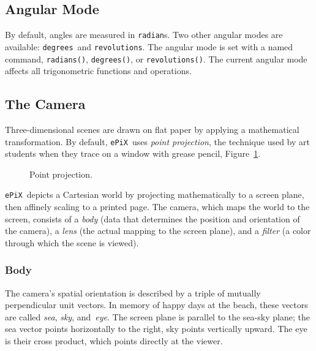 \documentclass[12pt,letterpaper]{book}
\newcommand{\code}[1]{\texttt{#1}}
\newcommand{\ePiX}{\code{ePiX}}
\begin{document}
\subsection{Angular Mode}

By default, angles are measured in \code{radian}s. Two other angular
modes are available: \code{degrees}~and \code{revolutions}. The
angular mode is set with a named command, \code{radians()},
\code{degrees()}, or \code{revolutions()}. The current angular mode
affects all trigonometric functions and operations.


\subsection{The Camera}

Three-dimensional scenes are drawn on flat paper by applying a
mathematical transformation. By default, \ePiX\ uses \emph{point
projection}, the technique used by art students when they trace on a
window with grease pencil, Figure~\ref{fig-camera}.

\begin{figure}[hbt]
  \begin{center}
    
  \end{center}
  \vspace*{-0.25in}
  \caption{Point projection.}
  \label{fig-camera}
\end{figure}

\ePiX\ depicts a Cartesian world by projecting mathematically to a
screen plane, then affinely scaling to a printed page. The camera,
which maps the world to the screen, consists of a \emph{body} (data
that determines the position and orientation of the camera), a
\emph{lens} (the actual mapping to the screen plane), and a
\emph{filter} (a color through which the scene is viewed).


\subsubsection*{Body}

The camera's spatial orientation is described by a triple of mutually
perpendicular unit vectors.  In memory of happy days at the beach,
these vectors are called \emph{sea}, \emph{sky}, and~\emph{eye}. The
screen plane is parallel to the sea-sky plane; the sea vector points
horizontally to the right, sky points vertically upward. The eye is
their cross product, which points directly at the viewer.
\end{document}
